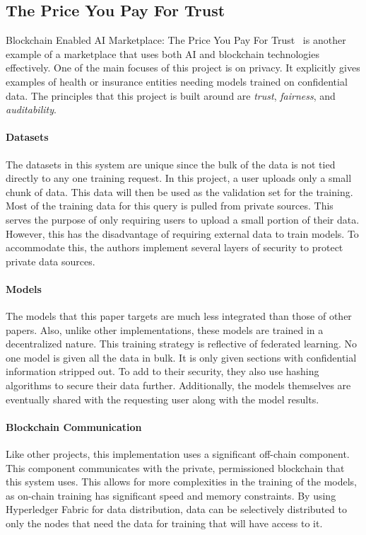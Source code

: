 \documentclass{ledger}
\begin{document}
\subsection{The Price You Pay For Trust}

Blockchain Enabled AI Marketplace: The Price You Pay For Trust~\cite{priceOfTrust} is another example of a marketplace that uses both AI and blockchain technologies effectively.  One of the main focuses of this project is on privacy. It explicitly gives examples of health or insurance entities needing models trained on confidential data.  The principles that this project is built around are \textit{trust}, \textit{fairness}, and \textit{auditability}.

\paragraph{Datasets}
The datasets in this system are unique since the bulk of the data is not tied directly to any one training request.
In this project, a user uploads only a small chunk of data.  This data will then be used as the validation set for the training.  Most of the training data for this query is pulled from private sources.  This serves the purpose of only requiring users to upload a small portion of their data.  However, this has the disadvantage of requiring external data to train models.  To accommodate this, the authors implement several layers of security to protect private data sources.

\paragraph{Models}
The models that this paper targets are much less integrated than those of other papers.  Also, unlike other implementations, these models are trained in a decentralized nature.  This training strategy is reflective of federated learning.  No one model is given all the data in bulk. It is only given sections with confidential information stripped out. To add to their security, they also use hashing algorithms to secure their data further.  Additionally, the models themselves are eventually shared with the requesting user along with the model results.

\paragraph{Blockchain Communication}
Like other projects, this implementation uses a significant off-chain component.  This component communicates with the private, permissioned blockchain that this system uses.  This allows for more complexities in the training of the models, as on-chain training has significant speed and memory constraints.  By using Hyperledger Fabric for data distribution, data can be selectively distributed to only the nodes that need the data for training that will
have access to it.
\end{document}
